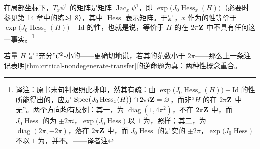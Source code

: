 \begin{remark}\label{thm:linearized-flow-matrix}
在局部坐标下，$T_x\psi^1$ 的矩阵是\trJacobi{}矩阵 $\operatorname{Jac}_x\psi^1$，即 $\exp\bigl(J_0\operatorname{Hess}_x(H)\bigr)$（必要时参见第 14 章中的练习~8），其中 $\operatorname{Hess}$ 表示\trHessian{}矩阵。于是，$x$ 作为\trPeriodic\trTrajectory{}的\trNondegenerate{}性等价于 $\exp\bigl(J_0\operatorname{Hess}_x(H)\bigr)-\mathrm{Id}$ 的\trInvertible{}性，也就是说，等价于 $H$ 的\trHessian{}在 $2\pi\mathbf{Z}$ 中不具有任何\trEigenvalue{}这一事实。\footnote{译注：原书末句判据照此排印，然其有疏：由 $\exp\bigl(J_0\operatorname{Hess}_x(H)\bigr)-\mathrm{Id}$ 的\trInvertible{}性所能得出的，应是 $\operatorname{Spec}\bigl(J_0\operatorname{Hess}_x(H)\bigr)\cap 2\pi i\mathbf{Z}=\varnothing$，而非“$H$ 的\trHessian{}在 $2\pi\mathbf{Z}$ 中无\trEigenvalue”。两个方向均有反例：其一，\trHessian{}为 $\operatorname{diag}(1,4\pi^2)$，\trSpectrum{}不在 $2\pi\mathbf{Z}$ 中，而 $J_0\operatorname{Hess}$ 的\trEigenvalue{}为 $\pm 2\pi i$，$\exp\bigl(J_0\operatorname{Hess}\bigr)$ 以 $1$ 为\trEigenvalue，照样\trDegenerate；其二，\trHessian{}为 $\operatorname{diag}(2\pi,-2\pi)$，\trSpectrum{}落在 $2\pi\mathbf{Z}$ 中，而 $J_0\operatorname{Hess}$ 的\trEigenvalue{}是实的 $\pm 2\pi$，$\exp\bigl(J_0\operatorname{Hess}\bigr)$ 不以 $1$ 为\trEigenvalue，并不\trDegenerate。——译者注}
\end{remark}

\begin{remark}\label{thm:small-hamiltonian-converse}
若\trHamiltonian{}量 $H$ 是“充分”$\mathcal{C}^2$-小的——更确切地说，若其\trHessian{}的范数小于 $2\pi$——那么上一条注记表明\cref{thm:critical-nondegenerate-transfer}的逆命题为真：两种\trNondegenerate{}性概念重合。
\end{remark}

